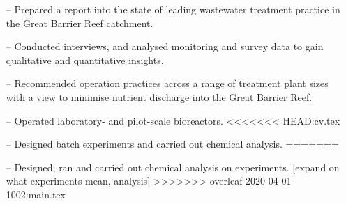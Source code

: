 \documentclass[10pt,a4paper]{altacv}
\begin{document}
\begin{itemize}
    \setlength{\itemindent}{0.3em}
    \item[--]   \small{Prepared a report into the state of leading 
    wastewater treatment practice in the Great Barrier Reef catchment.}
    \item[--]   \small{Conducted interviews, and analysed monitoring 
    and survey data to gain qualitative and quantitative insights.}
    \item[--]   \small{Recommended operation practices across a 
    range of treatment plant sizes with a view to minimise
    nutrient discharge into the Great Barrier Reef.}
\end{itemize}
\divider\smallskip


\begin{itemize}
    \setlength{\itemindent}{0.3em}
    \item[--]   \small{Operated laboratory- and pilot-scale bioreactors.}
<<<<<<< HEAD:cv.tex
    \item[--]   \small{Designed batch experiments and carried out chemical
    analysis.}
=======
    \item[--]   \small{Designed, ran and carried out chemical analysis on experiments. [expand on what experiments mean, analysis]}
>>>>>>> overleaf-2020-04-01-1002:main.tex
\end{itemize}

\divider\medskip

\newpage
\end{document}
